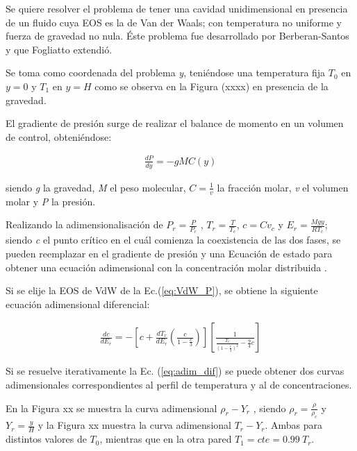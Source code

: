 Se quiere resolver el problema de tener una cavidad unidimensional en presencia de un fluido cuya EOS es la de Van der Waals; con temperatura  no uniforme y fuerza de gravedad no nula. Éste problema fue desarrollado por Berberan-Santos \cite{berberan2002liquid} y que Fogliatto \cite{fogliatto2019simulation} extendió. 

Se toma como coordenada del problema \textit{y}, teniéndose una temperatura fija $T_{0}$ en $y = 0$ y $T_{1}$ en $y = H$ como se observa en la Figura (xxxx) en presencia de la gravedad.

El gradiente de presión surge de realizar el balance de momento en un volumen de control, obteniéndose:

\begin{align}
	\frac{d P}{d y} = - g M C(y)
\end{align}

siendo \textit{g} la gravedad, \textit{M} el peso molecular, $C = \frac{1}{v}$ la fracción molar, \textit{v} el volumen molar y \textit{P} la presión.

Realizando la adimensionalisación de $ P_r = \frac{P}{P_c}$ , $ T_r = \frac{T}{T_c}$, $c = C v_c$ y $E_r = \frac{M g y}{R T_c}$; siendo \textit{c} el punto crítico en el cuál comienza la coexistencia de las dos fases, se pueden reemplazar en el gradiente de presión y una Ecuación de estado para obtener una ecuación adimensional con la concentración molar distribuida \cite{fogliatto2019simulation}.

Si se elije la EOS de VdW de la Ec.(\ref{eq:VdW_P}), se obtiene la siguiente ecuación adimensional diferencial:

\begin{align}
	\frac{d c}{d E_r} = - \left[ c + \frac{d T_r}{d E_r} \left( \frac{c}{1 - \frac{c}{3}}\right) \right] \left[	\frac{1}{\frac{T_r}{{\left(1- \frac{c}{3}\right)}^2} - \frac{9}{4} c}  \right] 
	\label{eq:adim_dif}
\end{align} 

Si se resuelve iterativamente la Ec. (\ref{eq:adim_dif}) se puede obtener dos curvas adimensionales correspondientes al perfil de temperatura y al de concentraciones.

En la Figura xx se muestra la curva adimensional $ \rho_r - Y_r $ , siendo $\rho_r = \frac{\rho}{\rho_c}$ y  $Y_r = \frac{y}{H}$  y la Figura xx muestra la curva adimensional $ T_r - Y_r $. Ambas para distintos valores de $T_0$, mientras que en la otra pared $T_1 = cte = 0.99 \> T_r$.

